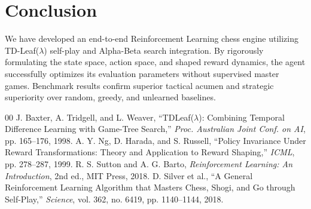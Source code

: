 \documentclass[conference,10pt,twocolumn]{IEEEtran}
\begin{document}
\section{Conclusion}
We have developed an end-to-end Reinforcement Learning chess engine utilizing TD-Leaf($\lambda$) self-play and Alpha-Beta search integration. By rigorously formulating the state space, action space, and shaped reward dynamics, the agent successfully optimizes its evaluation parameters without supervised master games. Benchmark results confirm superior tactical acumen and strategic superiority over random, greedy, and unlearned baselines.

\begin{thebibliography}{00}
 J. Baxter, A. Tridgell, and L. Weaver, ``TDLeaf($\lambda$): Combining Temporal Difference Learning with Game-Tree Search,'' \textit{Proc. Australian Joint Conf. on AI}, pp. 165--176, 1998.
 A. Y. Ng, D. Harada, and S. Russell, ``Policy Invariance Under Reward Transformations: Theory and Application to Reward Shaping,'' \textit{ICML}, pp. 278--287, 1999.
 R. S. Sutton and A. G. Barto, \textit{Reinforcement Learning: An Introduction}, 2nd ed., MIT Press, 2018.
 D. Silver et al., ``A General Reinforcement Learning Algorithm that Masters Chess, Shogi, and Go through Self-Play,'' \textit{Science}, vol. 362, no. 6419, pp. 1140--1144, 2018.
\end{thebibliography}
\end{document}
